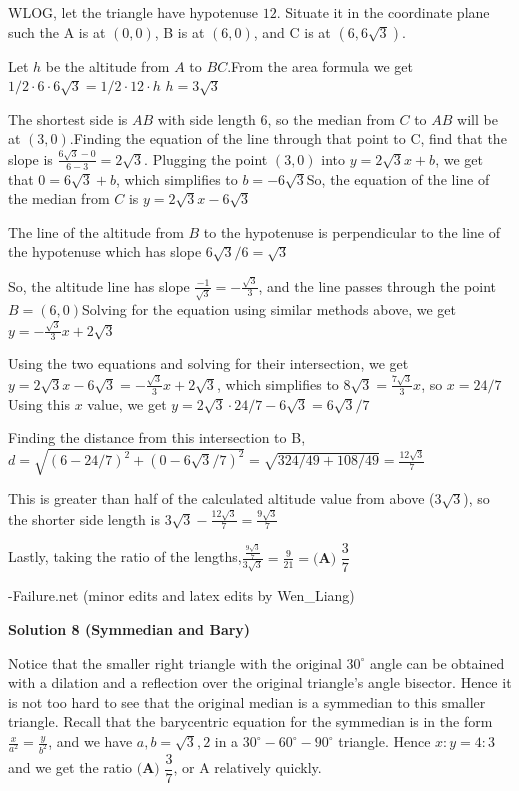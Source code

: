 \begin{enumerate}
WLOG, let the triangle have hypotenuse $12$. Situate it in the coordinate plane such the A is at $(0,0)$, B is at $(6,0)$, and C is at $(6,6\sqrt{3})$. 

 Let $h$ be the altitude from $A$ to $BC$.From the area formula we get  $1/2 \cdot 6\cdot6\sqrt{3} =1/2\cdot12\cdot h$
$h = 3\sqrt{3}$

 The shortest side is $AB$ with side length $6$, so the median from $C$ to $AB$ will be at $(3,0)$.Finding the equation of the line through that point to C, find that the slope is $\frac{6\sqrt{3}-0}{6-3}=2\sqrt3$. Plugging the point $(3,0)$ into $y=2\sqrt{3}x+b$, we get that $0=6\sqrt{3}+b$, which simplifies to $b=-6\sqrt{3}$So, the equation of the line of the median from $C$ is $y=2\sqrt{3}x-6\sqrt3$

 The line of the altitude from $B$ to the hypotenuse is perpendicular to the line of the hypotenuse which has slope $6\sqrt{3}/6=\sqrt{3}$

 So, the altitude line has slope $\frac{-1}{\sqrt{3}}=-\frac{\sqrt{3}}{3}$, and the line passes through the point $B = (6,0)$Solving for the equation using similar methods above, we get $y=-\frac{\sqrt{3}}{3}x+2\sqrt{3}$

 Using the two equations and solving for their intersection, we get $y=2\sqrt{3}x-6\sqrt3=-\frac{\sqrt{3}}{3}x+2\sqrt{3}$, which simplifies to $8\sqrt3=\frac{7\sqrt{3}}{3}x$, so $x=24/7$Using this $x$ value, we get $y=2\sqrt{3}\cdot24/7-6\sqrt{3}=6\sqrt{3}/7$

 Finding the distance from this intersection to B, $d=\sqrt{(6-24/7)^2+(0-6\sqrt{3}/7)^2} = \sqrt{324/49+108/49}=\frac{12\sqrt{3}}{7}$

 This is greater than half of the calculated altitude value from above ($3\sqrt{3}$), so the shorter side length is $3\sqrt{3}-\frac{12\sqrt{3}}{7}=\frac{9\sqrt{3}}{7}$

 Lastly, taking the ratio of the lengths,$\frac{\frac{9\sqrt{3}}{7}}{3\sqrt{3}}=\frac{9}{21}=\boxed{\textbf{(A) } \dfrac{3}{7}}$

 -Failure.net (minor edits and latex edits by Wen\_Liang)

 



\textbf{Solution 8 (Symmedian and Bary)}

Notice that the smaller right triangle with the original $30^\circ$ angle can be obtained with a dilation and a reflection over the original triangle’s angle bisector. Hence it is not too hard to see that the original median is a symmedian to this smaller triangle. Recall that the barycentric equation for the symmedian is in the form $\frac x{a^2}=\frac y{b^2}$, and we have $a,b=\sqrt3,2$ in a $30^\circ-60^\circ-90^\circ$ triangle. Hence $x:y=4:3$ and we get the ratio $\textbf{(A) } \dfrac{3}{7}$, or A relatively quickly.


\end{enumerate}
